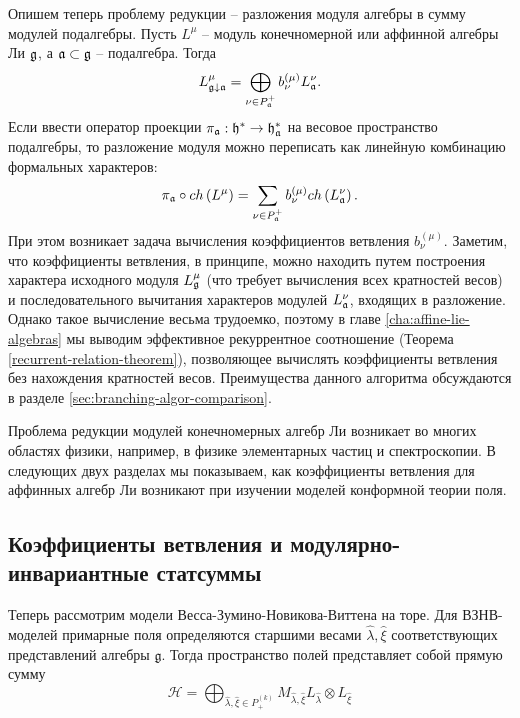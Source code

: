 Опишем теперь проблему редукции -- разложения модуля алгебры в сумму модулей подалгебры. Пусть $L^{\mu}$ -- модуль конечномерной или аффинной алгебры Ли $\mathfrak{g}$, а $\mathfrak{a}\subset\mathfrak{g}$ -- подалгебра. Тогда 
\begin{equation}
  L_{\mathfrak{g}\downarrow \mathfrak{a}}^{\mu }=\bigoplus
\limits_{\nu \in P_{\mathfrak{a}}^{+}}b_{\nu }^{\left( \mu \right) }L_{\mathfrak{a}}^{\nu }.
\end{equation}
Если ввести оператор проекции  $\pi_{\mathfrak{a}}:\mathfrak{h}^{*}\to\mathfrak{h}_{\mathfrak{a}}^*$ на весовое пространство подалгебры, то разложение модуля можно переписать как линейную комбинацию формальных характеров:
\begin{equation}
 \pi _{\mathfrak{a}}\circ ch\left( L^{\mu }\right)
 =\sum_{\nu \in P_{\mathfrak{a}}^{+}}b_{\nu }^{(\mu)}ch\left( L_{\mathfrak{a}}^{\nu }\right) .
\end{equation}
При этом возникает задача вычисления  коэффициентов ветвления $b^{(\mu)}_{\nu}$. Заметим, что коэффициенты ветвления, в принципе, можно находить путем построения характера исходного модуля $L^{\mu}_{\mathfrak{g}}$ (что требует вычисления всех кратностей весов) и последовательного вычитания характеров модулей $L^{\nu}_{\mathfrak{a}}$, входящих в разложение. Однако такое вычисление весьма трудоемко, поэтому в главе \ref{cha:affine-lie-algebras} мы выводим эффективное рекуррентное соотношение (Теорема \ref{recurrent-relation-theorem}), позволяющее вычислять коэффициенты ветвления без нахождения кратностей весов. Преимущества данного алгоритма обсуждаются в разделе \ref{sec:branching-algor-comparison}.   

Проблема редукции модулей конечномерных алгебр Ли возникает во многих областях физики, например, в физике элементарных частиц и спектроскопии. В следующих двух разделах мы показываем, как коэффициенты ветвления для аффинных алгебр Ли возникают при изучении моделей конформной теории поля.

\subsection{Коэффициенты ветвления и модулярно-инвариантные статсуммы}
\label{sec:modular-invariance}


Теперь рассмотрим модели Весса-Зумино-Новикова-Виттена на торе. Для ВЗНВ-моделей примарные поля определяются старшими весами  $\hat \lambda, \hat \xi$ соответствующих представлений алгебры $\mathfrak{g}$. Тогда пространство полей представляет собой прямую сумму
\begin{equation}
  \label{eq:76}\mathcal{H}=\bigoplus_{\hat \lambda,\hat \xi\in P^{(k)}_{+}}M_{\hat \lambda,\hat \xi}
L_{\hat \lambda}\otimes L_{\hat \xi}
\end{equation}

